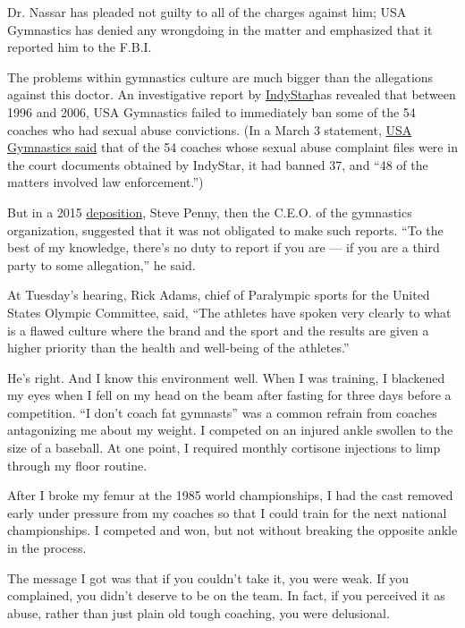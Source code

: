 Dr. Nassar has pleaded not guilty to all of the charges against him; USA
Gymnastics has denied any wrongdoing in the matter and emphasized that
it reported him to the F.B.I.

The problems within gymnastics culture are much bigger than the
allegations against this doctor. An investigative report by
\href{http://www.indystar.com/story/news/2017/03/16/indianapolis-star-indystar-usa-gymnastics-steve-penny-child-sexual-abuse/99270916/}{IndyStar}has
revealed that between 1996 and 2006, USA Gymnastics failed to
immediately ban some of the 54 coaches who had sexual abuse convictions.
(In a March 3 statement,
\href{https://www.usagym.org/pages/post.html?PostID=19818}{USA
Gymnastics said} that of the 54 coaches whose sexual abuse complaint
files were in the court documents obtained by IndyStar, it had banned
37, and ``48 of the matters involved law enforcement.'')

But in a 2015
\href{https://www.documentcloud.org/documents/2940062-Penny-No-Duty-for-Third-Party-to-Report.html}{deposition},
Steve Penny, then the C.E.O. of the gymnastics organization, suggested
that it was not obligated to make such reports. ``To the best of my
knowledge, there's no duty to report if you are --- if you are a third
party to some allegation,'' he said.

At Tuesday's hearing, Rick Adams, chief of Paralympic sports for the
United States Olympic Committee, said, ``The athletes have spoken very
clearly to what is a flawed culture where the brand and the sport and
the results are given a higher priority than the health and well-being
of the athletes.''

He's right. And I know this environment well. When I was training, I
blackened my eyes when I fell on my head on the beam after fasting for
three days before a competition. ``I don't coach fat gymnasts'' was a
common refrain from coaches antagonizing me about my weight. I competed
on an injured ankle swollen to the size of a baseball. At one point, I
required monthly cortisone injections to limp through my floor routine.

After I broke my femur at the 1985 world championships, I had the cast
removed early under pressure from my coaches so that I could train for
the next national championships. I competed and won, but not without
breaking the opposite ankle in the process.

The message I got was that if you couldn't take it, you were weak. If
you complained, you didn't deserve to be on the team. In fact, if you
perceived it as abuse, rather than just plain old tough coaching, you
were delusional.

